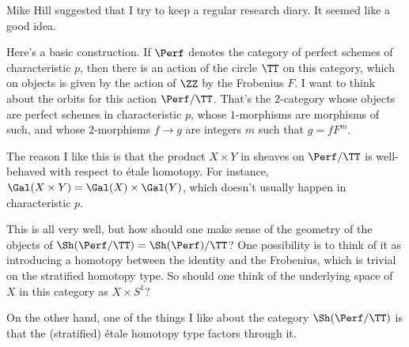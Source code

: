 
Mike Hill suggested that I try to keep a regular research diary.
It seemed like a good idea.

Here's a basic construction.
If $\Perf$ denotes the category of perfect schemes of characteristic $p$,
then there is an action of the circle $\TT$ on this category,
which on objects is given by the action of $\ZZ$ by the Frobenius $F$.
I want to think about the orbits for this action $\Perf/\TT$.
That's the $2$-category whose objects are perfect schemes in characteristic $p$,
whose $1$-morphisms are morphisms of such,
and whose $2$-morphisms $f \to g$ are integers $m$ such that $g = f F^m$.

The reason I like this is that the product $X \times Y$ in sheaves%
on $\Perf/\TT$ is well-behaved with respect to étale homotopy.
For instance, $\Gal(X\times Y) = \Gal(X) \times \Gal(Y)$,
which doesn't usually happen in characteristic $p$.

This is all very well, but
how should one make sense of the geometry of the objects of $\Sh(\Perf/\TT) = \Sh(\Perf)/\TT$?%
One possibility is to think of it as introducing a homotopy between the identity and the Frobenius,
which is trivial on the stratified homotopy type.
So should one think of the underlying space of $X$ in this category as $X \times S^1$?

On the other hand, one of the things I like about the category $\Sh(\Perf/\TT)$
is that the (stratified) étale homotopy type factors through it.


